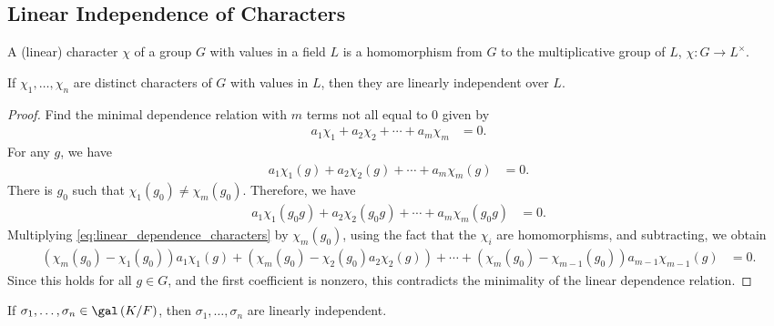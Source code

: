 \documentclass[10pt]{mypackage}
\begin{document}
\subsection{Linear Independence of Characters}%
\begin{definition}
  A (linear) character $\chi$ of a group $G$ with values in a field $L$ is a homomorphism from $G$ to the multiplicative group of $L$, $\chi\colon G\rightarrow L^{\times}$.
\end{definition}
\begin{theorem}
  If $\chi_1,\dots,\chi_n$ are distinct characters of $G$ with values in $L$, then they are linearly independent over $L$.
\end{theorem}
\begin{proof}
  Find the minimal dependence relation with $m$ terms not all equal to $0$ given by
  \begin{align*}
    a_1\chi_1 + a_2\chi_2 + \cdots + a_m\chi_m &= 0.
  \end{align*}
  For any $g$, we have
  \begin{align*}
    a_1\chi_1(g) + a_2\chi_2(g) + \cdots + a_m\chi_m(g) &= 0.\label{eq:linear_dependence_characters}\tag{$\ast$}
  \end{align*}
  There is $g_0$ such that $\chi_1\left( g_0 \right)\neq \chi_m\left( g_0 \right)$. Therefore, we have
  \begin{align*}
    a_1\chi_1\left( g_0g \right) + a_2\chi_2\left( g_0 g \right) + \cdots + a_m\chi_m\left( g_0 g \right) &= 0.
  \end{align*}
  Multiplying \eqref{eq:linear_dependence_characters} by $\chi_m\left( g_0 \right)$, using the fact that the $\chi_i$ are homomorphisms, and subtracting, we obtain
  \begin{align*}
    \left( \chi_m\left( g_0 \right)-\chi_1\left( g_0 \right) \right)a_1\chi_1\left( g \right) + \left( \chi_m\left( g_0 \right)-\chi_2\left( g_0 \right)a_2\chi_2(g) \right) + \cdots + \left( \chi_m\left( g_0 \right)-\chi_{m-1}\left( g_0 \right) \right)a_{m-1}\chi_{m-1}(g) &= 0.
  \end{align*}
  Since this holds for all $g\in G$, and the first coefficient is nonzero, this contradicts the minimality of the linear dependence relation.
\end{proof}
\begin{corollary}
  If $\sigma_1,\dots,\sigma_n\in \gal\left( K/F \right)$, then $\sigma_1,\dots,\sigma_n$ are linearly independent.
\end{corollary}
\end{document}
